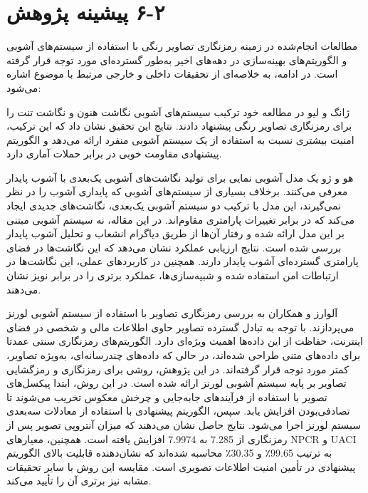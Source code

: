 \section{‏۲‏-‏۶‏ پیشینه پژوهش}

مطالعات انجام‌شده در زمینه رمزنگاری تصاویر رنگی با استفاده از سیستم‌های آشوبی و الگوریتم‌های بهینه‌سازی در دهه‌های اخیر به‌طور گسترده‌ای مورد توجه قرار گرفته است. در ادامه، به خلاصه‌ای از  تحقیقات داخلی و خارجی مرتبط با موضوع اشاره می‌شود:

ژانگ و لیو\cite{ref3} در مطالعه خود ترکیب سیستم‌های آشوبی نگاشت هنون و نگاشت تنت را برای رمزنگاری تصاویر رنگی پیشنهاد دادند. نتایج این تحقیق نشان داد که این ترکیب، امنیت بیشتری نسبت به استفاده از یک سیستم آشوبی منفرد ارائه می‌دهد و الگوریتم پیشنهادی مقاومت خوبی در برابر حملات آماری دارد.

هو و ژو \cite{ref4} یک مدل آشوبی نمایی برای تولید نگاشت‌های آشوبی یک‌بعدی با آشوب پایدار معرفی می‌کنند. برخلاف بسیاری از سیستم‌های آشوبی که پایداری آشوب را در نظر نمی‌گیرند، این مدل با ترکیب دو سیستم آشوبی یک‌بعدی، نگاشت‌های جدیدی ایجاد می‌کند که در برابر تغییرات پارامتری مقاوم‌اند. در این مقاله، نه سیستم آشوبی مبتنی بر این مدل ارائه شده و رفتار آن‌ها از طریق دیاگرام انشعاب و تحلیل آشوب پایدار بررسی شده است. نتایج ارزیابی عملکرد نشان می‌دهد که این نگاشت‌ها در فضای پارامتری گسترده‌ای آشوب پایدار دارند. همچنین در کاربردهای عملی، این نگاشت‌ها در ارتباطات امن استفاده شده و شبیه‌سازی‌ها، عملکرد برتری را در برابر نویز نشان می‌دهند.

آلوارز و همکاران \cite{ref6} به بررسی رمزنگاری تصاویر با استفاده از سیستم آشوبی لورنز می‌پردازند. با توجه به تبادل گسترده تصاویر حاوی اطلاعات مالی و شخصی در فضای اینترنت، حفاظت از این داده‌ها اهمیت ویژه‌ای دارد. الگوریتم‌های رمزنگاری سنتی عمدتا برای داده‌های متنی طراحی شده‌اند، در حالی که داده‌های چندرسانه‌ای، به‌ویژه تصاویر، کمتر مورد توجه قرار گرفته‌اند. در این پژوهش، روشی برای رمزنگاری و رمزگشایی تصاویر بر پایه سیستم آشوبی لورنز ارائه شده است. در این روش، ابتدا پیکسل‌های تصویر با استفاده از فرآیندهای جابه‌جایی و چرخش معکوس تخریب می‌شوند تا تصادفی‌بودن افزایش یابد. سپس، الگوریتم پیشنهادی با استفاده از معادلات سه‌بعدی سیستم لورنز اجرا می‌شود. نتایج حاصل نشان می‌دهند که میزان آنتروپی تصویر پس از رمزنگاری از 7.285 به 7.9974 افزایش یافته است. همچنین، معیارهای NPCR و UACI به ترتیب 99.65٪ و 30.35٪ محاسبه شده‌اند که نشان‌دهنده قابلیت بالای الگوریتم پیشنهادی در تأمین امنیت اطلاعات تصویری است. مقایسه این روش با سایر تحقیقات مشابه نیز برتری آن را تأیید می‌کند.

